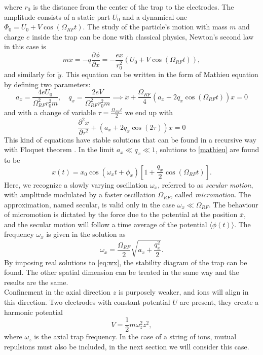 where $r_0$ is the distance from the center of the trap to the electrodes. The amplitude consists of a static part $U_0$ and a dynamical one $\Phi_0 = U_0 + V \cos(\Omega_{RF} t)$.
The study of the particle's motion with mass $m$ and charge $e$ inside the trap can be done with classical physics, Newton's second law in this case is
\begin{equation}
m\ddot{x} = -q \frac{\partial \phi}{\partial x} = - \frac{ex}{r_0^2}\left(U_0 + V \cos(\Omega_{RF} t) \right),
\end{equation}
and similarly for $\ddot{y}$. This equation can be written in the form of Mathieu equation \cite{Richards1983} by defining two parameters:
\begin{equation}
a_x = \frac{4eU_0}{\Omega_{RF}^2r_0^2m}, \quad q_x = \frac{2eV}{\Omega_{RF}^2r_0^2m} \implies \ddot{x} +\frac{\Omega_{RF}}{4} \left(a_x + 2q_x \cos(\Omega_{RF} t )\right)x = 0
\end{equation}
and with a change of variable $\tau = \frac{\Omega_{RF} t}{2}$ we end up with
\begin{equation}
\label{mathieu}
\frac{\partial^2 x}{\partial \tau^2}+\left(a_x + 2q_x \cos(2\tau)\right)x = 0
\end{equation}
This kind of equations have stable solutions that can be found in a recursive way with Floquet theorem \cite{iondynamic}. In the limit $a_x \ll q_x \ll 1$, solutions to \eqref{mathieu} are found to be
\begin{equation}
x(t) = x_0 \cos(\omega_x t +\phi_x)\left[1 + \frac{q_x}{2}\cos(\Omega_{RF} t) \right].
\end{equation}
Here, we recognize a slowly varying oscillation $\omega_x$, referred to as \emph{secular motion}, with amplitude modulated by a faster oscillation $\Omega_{RF}$, called \emph{micromotion}. The approximation, named secular, is valid only in the case $\omega_x \ll \Omega_{RF}$. The behaviour of micromotion is dictated by the force due to the potential at the position $\bar{x}$, and the secular motion will follow a time average of the potential $\langle \phi(t) \rangle$. The frequency $\omega_x$ is given in the solution as
\begin{equation}
\label{eq:wx}
\omega_x = \frac{\Omega_{RF}}{2}\sqrt{a_x + \frac{q_x^2}{2}}.
\end{equation}
By imposing real solutions to \eqref{eq:wx}, the stability diagram of the trap can be found. The other spatial dimension can be treated in the same way and the results are the same.\\
Confinement in the axial direction $z$ is purposely weaker, and ions will align in this direction. Two electrodes with constant potential $U$ are present, they create a harmonic potential
\begin{equation}
V = \frac{1}{2}m\omega_z^2z^2,
\end{equation}
where $\omega_z$ is the axial trap frequency. In the case of a string of ions, mutual repulsions must also be included, in the next section we will consider this case.

